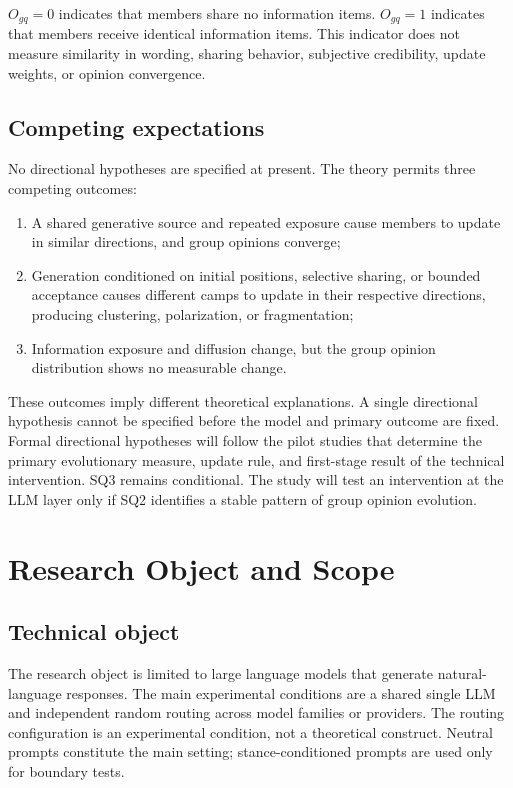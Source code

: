 \documentclass[11pt,a4paper]{article}
\begin{document}
$O_{gq}=0$ indicates that members share no information items. $O_{gq}=1$ indicates that members receive identical information items. This indicator does not measure similarity in wording, sharing behavior, subjective credibility, update weights, or opinion convergence.

\subsection{Competing expectations}

No directional hypotheses are specified at present. The theory permits three competing outcomes:

\begin{enumerate}
\item A shared generative source and repeated exposure cause members to update in similar directions, and group opinions converge;
\item Generation conditioned on initial positions, selective sharing, or bounded acceptance causes different camps to update in their respective directions, producing clustering, polarization, or fragmentation;
\item Information exposure and diffusion change, but the group opinion distribution shows no measurable change.
\end{enumerate}

These outcomes imply different theoretical explanations. A single directional hypothesis cannot be specified before the model and primary outcome are fixed. Formal directional hypotheses will follow the pilot studies that determine the primary evolutionary measure, update rule, and first-stage result of the technical intervention. SQ3 remains conditional. The study will test an intervention at the LLM layer only if SQ2 identifies a stable pattern of group opinion evolution.

\section{Research Object and Scope}

\subsection{Technical object}

The research object is limited to large language models that generate natural-language responses. The main experimental conditions are a shared single LLM and independent random routing across model families or providers. The routing configuration is an experimental condition, not a theoretical construct. Neutral prompts constitute the main setting; stance-conditioned prompts are used only for boundary tests.
\end{document}
